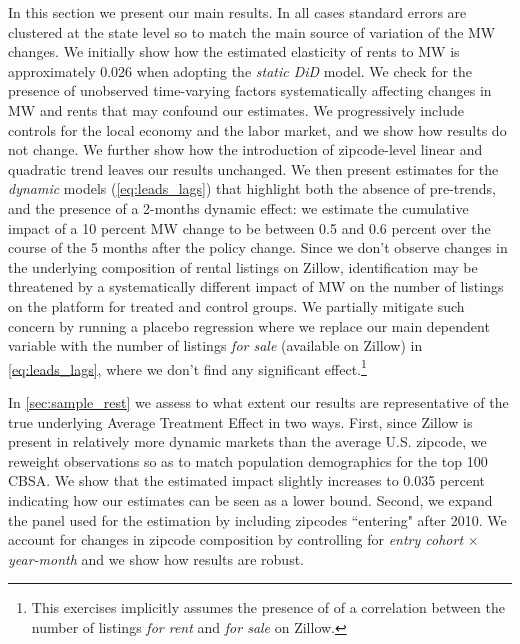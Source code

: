 
In this section we present our main results. In all cases standard errors are clustered at the 
state level so to match the main source of variation of the MW changes. We initially show how the 
estimated elasticity of rents to MW is approximately 0.026 when adopting the \textit{static DiD} 
model. We  check for the presence of unobserved time-varying factors systematically affecting changes 
in MW and rents that may confound our estimates. We progressively 
include controls for the local economy and the labor market, and we show how results 
do not change. We further show how the introduction of zipcode-level linear and quadratic 
trend leaves our results unchanged.  We then present estimates for the \textit{dynamic} models 
(\autoref{eq:leads_lags}) that highlight both the absence 
of pre-trends, and the presence of a 2-months dynamic effect: we estimate the cumulative impact of a 10 percent MW 
change to be between 0.5 and 0.6 percent over the course of the 5 months after the policy 
change. Since we don't observe changes in the underlying composition of rental listings on Zillow, 
identification may be threatened by a systematically different impact of MW on the number of listings on the platform 
for treated and control groups. We partially  mitigate such concern by running a placebo regression 
where we replace our main dependent variable with the number of listings \textit{for sale} (available on Zillow)
in \autoref{eq:leads_lags}, where we don't find any significant effect.\footnote{This exercises implicitly assumes 
the presence of of a correlation between the number of listings \textit{for rent} and 
\textit{for sale} on Zillow.}  

In \autoref{sec:sample_rest} we assess to what extent our results are representative of the true 
underlying Average Treatment Effect in two ways. First, since Zillow is present in relatively more 
dynamic markets than the average U.S. zipcode, we reweight observations so as to match population 
demographics for the top 100 CBSA. We show that the estimated impact slightly increases to 0.035 
percent indicating how our estimates can be seen as a lower bound. Second, we expand the panel used 
for the estimation by including zipcodes ``entering" after 2010. We account for changes in zipcode 
composition by controlling for \textit{entry cohort} $\times$ \textit{year-month} and we show how 
results are robust. %

